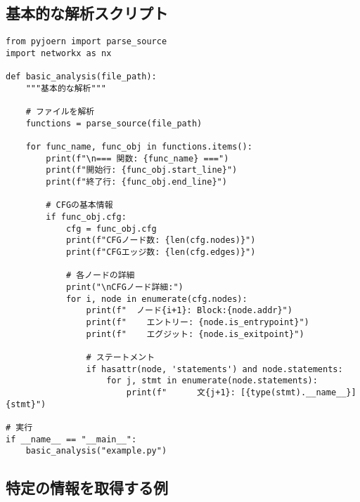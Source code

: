 \documentclass[12pt,a4paper]{article}
\begin{document}
\subsection{基本的な解析スクリプト}

\begin{lstlisting}
from pyjoern import parse_source
import networkx as nx

def basic_analysis(file_path):
    """基本的な解析"""

    # ファイルを解析
    functions = parse_source(file_path)

    for func_name, func_obj in functions.items():
        print(f"\n=== 関数: {func_name} ===")
        print(f"開始行: {func_obj.start_line}")
        print(f"終了行: {func_obj.end_line}")

        # CFGの基本情報
        if func_obj.cfg:
            cfg = func_obj.cfg
            print(f"CFGノード数: {len(cfg.nodes)}")
            print(f"CFGエッジ数: {len(cfg.edges)}")

            # 各ノードの詳細
            print("\nCFGノード詳細:")
            for i, node in enumerate(cfg.nodes):
                print(f"  ノード{i+1}: Block:{node.addr}")
                print(f"    エントリー: {node.is_entrypoint}")
                print(f"    エグジット: {node.is_exitpoint}")

                # ステートメント
                if hasattr(node, 'statements') and node.statements:
                    for j, stmt in enumerate(node.statements):
                        print(f"      文{j+1}: [{type(stmt).__name__}] {stmt}")

# 実行
if __name__ == "__main__":
    basic_analysis("example.py")
\end{lstlisting}

\subsection{特定の情報を取得する例}
\end{document}
